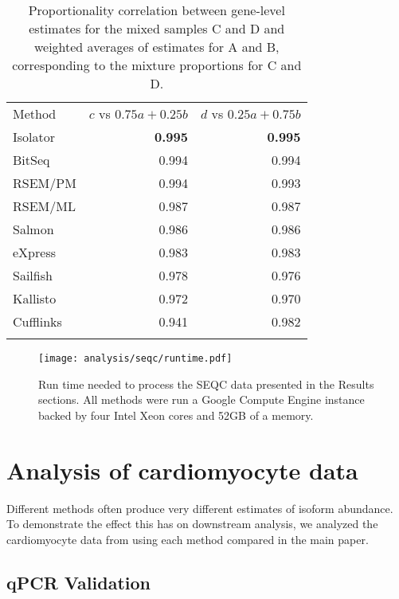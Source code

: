 \documentclass{article}
\begin{document}
\begin{table}
\begin{center}
\begin{tabular}[c]{@{}lrr@{}}
\toprule\addlinespace
Method & $c$ vs $0.75a + 0.25b$ & $d$ vs $0.25a + 0.75b$
\\\addlinespace
\midrule
Isolator & \textbf{0.995} & \textbf{0.995}
\\\addlinespace
BitSeq & 0.994 & 0.994
\\\addlinespace
RSEM/PM & 0.994 & 0.993
\\\addlinespace
RSEM/ML & 0.987 & 0.987
\\\addlinespace
Salmon & 0.986 & 0.986
\\\addlinespace
eXpress & 0.983 & 0.983
\\\addlinespace
Sailfish & 0.978 & 0.976
\\\addlinespace
Kallisto & 0.972 & 0.970
\\\addlinespace
Cufflinks & 0.941 & 0.982
\\\addlinespace
\bottomrule
\addlinespace
\end{tabular}
\caption{Proportionality correlation between gene-level estimates for
the mixed samples C and D and weighted averages of estimates for A and
B, corresponding to the mixture proportions for C and D.}
\label{table:seqcgenes}
\end{center}
\end{table}

\begin{figure}
\begin{center}
\texttt{[image: analysis/seqc/runtime.pdf]}
\caption{Run time needed to process the SEQC data presented in the Results
sections. All methods were run a Google Compute Engine instance backed by four
Intel Xeon cores and 52GB of a memory.}
\label{fig:runtime}
\end{center}
\end{figure}

\section{Analysis of cardiomyocyte data}

Different methods often produce very different estimates of isoform abundance.
To demonstrate the effect this has on downstream analysis, we analyzed the
cardiomyocyte data from \cite{Kuppusamy:2015ey} using each method compared in
the main paper.

\subsection{qPCR Validation}\label{cardioqpcr}
\end{document}
